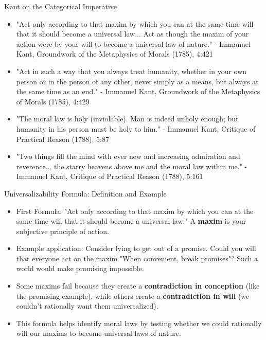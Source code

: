 \documentclass{beamer}
\begin{document}
\begin{frame}{Kant on the Categorical Imperative}
\begin{itemize}
   \item "Act only according to that maxim by which you can at the same time will that it should become a universal law... Act as though the maxim of your action were by your will to become a universal law of nature."
   - Immanuel Kant, Groundwork of the Metaphysics of Morals (1785), 4:421
   
   \item "Act in such a way that you always treat humanity, whether in your own person or in the person of any other, never simply as a means, but always at the same time as an end."
   - Immanuel Kant, Groundwork of the Metaphysics of Morals (1785), 4:429
   
   \item "The moral law is holy (inviolable). Man is indeed unholy enough; but humanity in his person must be holy to him."
   - Immanuel Kant, Critique of Practical Reason (1788), 5:87
   
   \item "Two things fill the mind with ever new and increasing admiration and reverence... the starry heavens above me and the moral law within me."
   - Immanuel Kant, Critique of Practical Reason (1788), 5:161
\end{itemize}
\end{frame}

\begin{frame}{Universalizability Formula: Definition and Example}
\begin{itemize}
    \item First Formula: "Act only according to that maxim by which you can at the same time will that it should become a universal law." A \textbf{maxim} is your subjective principle of action.
    
    \item Example application: Consider lying to get out of a promise. Could you will that everyone act on the maxim "When convenient, break promises"? Such a world would make promising impossible.
    
    \item Some maxims fail because they create a \textbf{contradiction in conception} (like the promising example), while others create a \textbf{contradiction in will} (we couldn't rationally want them universalized).
    
    \item This formula helps identify moral laws by testing whether we could rationally will our maxims to become universal laws of nature.
\end{itemize}
\end{frame}
\end{document}
